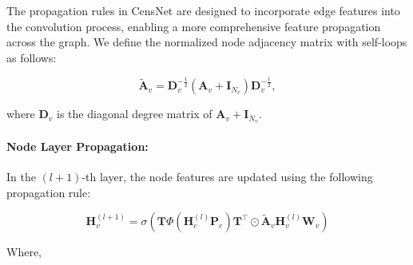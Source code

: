 The propagation rules in CensNet are designed to incorporate edge features into the convolution process, enabling a more comprehensive feature propagation across the graph. We define the normalized node adjacency matrix with self-loops as follows:

\begin{equation}
\tilde{\mathbf{A}}_v = \mathbf{D}_v^{-\frac{1}{2}} (\mathbf{A}_v + \mathbf{I}_{N_v}) \mathbf{D}_v^{-\frac{1}{2}},
    \label{eq:normalized_node_adjacency}
\end{equation}

\noindent where $\mathbf{D}_v$ is the diagonal degree matrix of $\mathbf{A}_v + \mathbf{I}_{N_v}$.

\paragraph{Node Layer Propagation:}


In the $(l+1)$-th layer, the node features are updated using the following propagation rule:


\begin{equation}
    \mathbf{H}^{(l+1)}_v = \sigma\left(\mathbf{T} \Phi\left(\mathbf{H}^{(l)}_e \mathbf{P}_e\right)\mathbf{T}^\top \odot \tilde{\mathbf{A}}_v \mathbf{H}^{(l)}_v \mathbf{W}_v\right) 
    \label{eq:CensNet_propagation}
\end{equation}

\noindent Where, 

